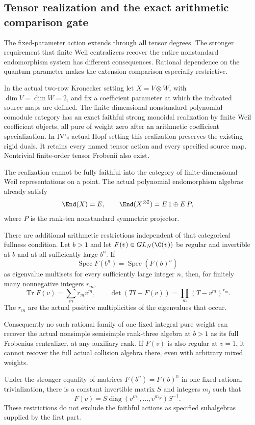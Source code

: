 \subsection{Tensor realization and the exact arithmetic comparison gate}
The fixed-parameter action extends through all tensor degrees.
The stronger requirement that finite Weil centralizers recover the
entire nonstandard endomorphism system has different consequences.
Rational dependence on the quantum parameter makes the extension
comparison especially restrictive.

\begin{finding}\label{f:tensorweilgate}
In the actual two-row Kronecker setting let $X=V\otimes W$,
with $\dim V=\dim W=2$, and fix a coefficient parameter at which
the indicated source maps are defined.
The finite-dimensional nonstandard polynomial-comodule category
has an exact faithful strong monoidal realization by finite
Weil coefficient objects, all pure of weight zero after an
arithmetic coefficient specialization. In IV's actual Hopf
setting this realization preserves the existing rigid duals.
It retains every named tensor action and every specified
source map. Nontrivial finite-order tensor Frobenii also exist.

The realization cannot be fully faithful into the category of
finite-dimensional Weil representations on a point.
The actual polynomial endomorphism algebras already satisfy
\[
 \End(X)=E,\qquad
 \End(X^{\otimes2})=E\,1\oplus E\,P,
\]
where $P$ is the rank-ten nonstandard symmetric projector.

There are additional arithmetic restrictions independent of
that categorical fullness condition. Let $b>1$ and let
$F(v)\in GL_N(\C(v))$ be regular and invertible at $b$ and
at all sufficiently large $b^n$. If
\begin{equation}\label{eq:tensorweilspectral}
 \operatorname{Spec}F(b^n)
   =\operatorname{Spec}(F(b)^n)
\end{equation}
as eigenvalue multisets for every sufficiently large integer $n$,
then, for finitely many nonnegative integers $r_m$,
\[
 \operatorname{Tr}F(v)=\sum_m r_m v^m,\qquad
 \det(TI-F(v))=\prod_m(T-v^m)^{r_m}.
\]
The $r_m$ are the actual positive multiplicities of the
eigenvalues that occur.

Consequently no such rational family of one fixed integral
pure weight can recover the actual nonsimple semisimple
rank-three algebra at $b>1$ as its full Frobenius centralizer,
at any auxiliary rank. If $F(v)$ is also regular at $v=1$,
it cannot recover the full actual collision algebra there,
even with arbitrary mixed weights.

Under the stronger equality of matrices
$F(b^n)=F(b)^n$ in one fixed rational trivialization,
there is a constant invertible matrix $S$ and integers $m_j$
such that
\[
 F(v)=S\operatorname{diag}(v^{m_1},\ldots,v^{m_N})S^{-1}.
\]
These restrictions do not exclude the faithful actions as
specified subalgebras supplied by the first part.
\end{finding}

